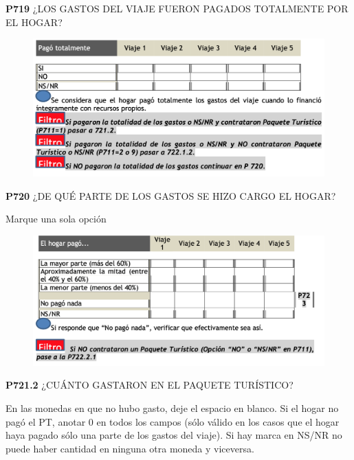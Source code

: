 \documentclass[
  openany]{book}
\begin{document}
\textbf{P719} ¿LOS GASTOS DEL VIAJE FUERON PAGADOS TOTALMENTE POR EL HOGAR?

\begin{figure}

{\centering \includegraphics[width=1\linewidth]{imagenes/figura6-248} 

}

\end{figure}

\textbf{P720} ¿DE QUÉ PARTE DE LOS GASTOS SE HIZO CARGO EL HOGAR?

Marque una sola opción

\begin{figure}

{\centering \includegraphics[width=1\linewidth]{imagenes/figura6-249} 

}

\end{figure}

\textbf{P721.2} ¿CUÁNTO GASTARON EN EL PAQUETE TURÍSTICO?

En las monedas en que no hubo gasto, deje el espacio en blanco. Si el hogar no pagó el PT, anotar 0 en todos los campos (sólo válido en los casos que el hogar haya pagado sólo una parte de los gastos del viaje). Si hay marca en NS/NR no puede haber cantidad en ninguna otra moneda y viceversa.
\end{document}
